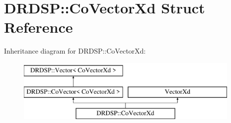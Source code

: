 \hypertarget{struct_d_r_d_s_p_1_1_co_vector_xd}{\section{D\-R\-D\-S\-P\-:\-:Co\-Vector\-Xd Struct Reference}
\label{struct_d_r_d_s_p_1_1_co_vector_xd}
}
Inheritance diagram for D\-R\-D\-S\-P\-:\-:Co\-Vector\-Xd\-:\begin{figure}[H]
\begin{center}
\leavevmode
\includegraphics[height=3.000000cm]{struct_d_r_d_s_p_1_1_co_vector_xd}
\end{center}
\end{figure}
